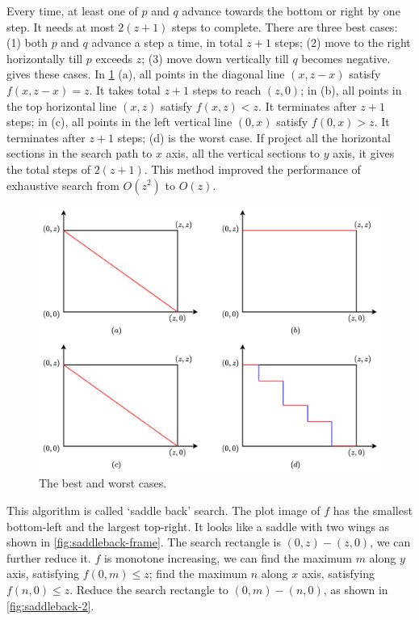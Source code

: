 \documentclass[b5paper]{article}
\begin{document}
Every time, at least one of $p$ and $q$ advance towards the bottom or right by one step. It needs at most $2(z+1)$ steps to complete. There are three best cases: (1) both $p$ and $q$ advance a step a time, in total $z + 1$ steps; (2) move to the right horizontally till $p$ exceeds $z$; (3) move down vertically till $q$ becomes negative.  gives these cases. In \cref{fig:saddleback-1-cases} (a), all points in the diagonal line $(x, z-x)$ satisfy $f(x, z-x) = z$. It takes total $z + 1$ steps to reach $(z, 0)$; in (b), all points in the top horizontal line $(x, z)$ satisfy $f(x, z) < z$. It terminates after $z + 1$ steps; in (c), all points in the left vertical line $(0, x)$ satisfy $f(0, x) > z$. It terminates after $z + 1$ steps; (d) is the worst case. If project all the horizontal sections in the search path to $x$ axis, all the vertical sections to $y$ axis, it gives the total steps of $2(z+1)$. This method improved the performance of exhaustive search from $O(z^2)$ to $O(z)$.

\begin{figure}[htbp]
 \centering
 \includegraphics[scale=0.5]{img/saddle-back-paths}
 \caption{The best and worst cases.}
 \label{fig:saddleback-1-cases}
\end{figure}

This algorithm is called `saddle back' search. The plot image of $f$ has the smallest bottom-left and the largest top-right. It looks like a saddle with two wings as shown in \cref{fig:saddleback-frame}. The search rectangle is $(0, z)- (z, 0)$, we can further reduce it. $f$ is monotone increasing, we can find the maximum $m$ along $y$ axis, satisfying $f(0, m) \leq z$; find the maximum $n$ along $x$ axis, satisfying $f(n, 0) \leq z$. Reduce the search rectangle to $(0, m) - (n, 0)$, as shown in \cref{fig:saddleback-2}.
\end{document}
